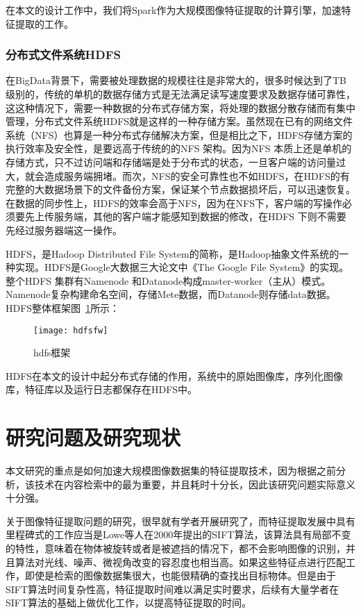 在本文的设计工作中，我们将Spark作为大规模图像特征提取的计算引擎，加速特征提取的工作。
\subsubsection{分布式文件系统HDFS}
在BigData背景下，需要被处理数据的规模往往是非常大的，很多时候达到了TB级别的，传统的单机的数据存储方式是无法满足读写速度要求及数据存储可靠性，这这种情况下，需要一种数据的分布式存储方案，将处理的数据分散存储而有集中管理，分布式文件系统HDFS就是这样的一种存储方案。虽然现在已有的网络文件系统（NFS）也算是一种分布式存储解决方案，但是相比之下，HDFS存储方案的执行效率及安全性，是要远高于传统的的NFS 架构。因为NFS 本质上还是单机的存储方式，只不过访问端和存储端是处于分布式的状态，一旦客户端的访问量过大，就会造成服务端拥堵。而次，NFS的安全可靠性也不如HDFS，在HDFS的有完整的大数据场景下的文件备份方案，保证某个节点数据损坏后，可以迅速恢复。在数据的同步性上，HDFS的效率会高于NFS，因为在NFS下，客户端的写操作必须要先上传服务端，其他的客户端才能感知到数据的修改，在HDFS 下则不需要先经过服务器端这一操作。

HDFS，是Hadoop Distributed File System的简称，是Hadoop抽象文件系统的一种实现。HDFS是Google大数据三大论文中《The Google File System》的实现。整个HDFS 集群有Namenode 和Datanode构成master-worker（主从）模式。Namenode复杂构建命名空间，存储Mete数据，而Datanode则存储data数据。HDFS整体框架图~\ref{fig:hdfsfw}所示：
\begin{figure}[htp]
\centering
\texttt{[image: hdfsfw]}
\caption{hdfs框架}
\label{fig:hdfsfw}
\end{figure}

HDFS在本文的设计中起分布式存储的作用，系统中的原始图像库，序列化图像库，特征库以及运行日志都保存在HDFS中。

\section{研究问题及研究现状}
本文研究的重点是如何加速大规模图像数据集的特征提取技术，因为根据之前分析，该技术在内容检索中的最为重要，并且耗时十分长，因此该研究问题实际意义十分强。

关于图像特征提取问题的研究，很早就有学者开展研究了，而特征提取发展中具有里程碑式的工作应当是Lowe等人在2000年提出的SIFT算法，该算法具有局部不变的特性，意味着在物体被旋转或者是被遮挡的情况下，都不会影响图像的识别，并且算法对光线、噪声、微视角改变的容忍度也相当高。如果这些特征点进行匹配工作，即使是检索的图像数据集很大，也能很精确的查找出目标物体。但是由于SIFT算法时间复杂性高，特征提取时间难以满足实时要求，后续有大量学者在SIFT算法的基础上做优化工作，以提高特征提取的时间。

